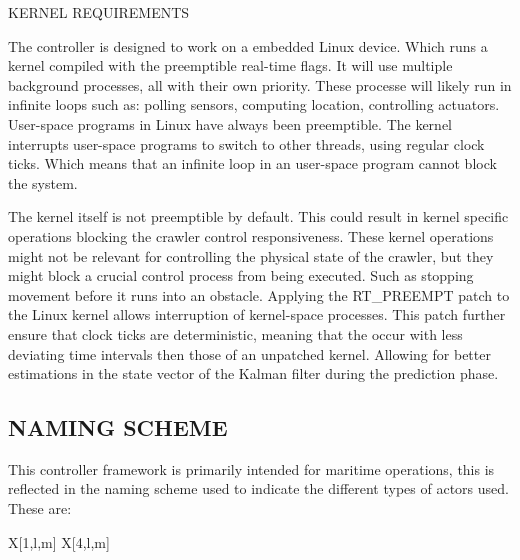 \begin{RoyalNote}[label=Kernel_req]{KERNEL REQUIREMENTS}

    The controller is designed to work on a embedded Linux device. Which runs a kernel compiled with the preemptible 
    real-time flags. It will use multiple background processes, all with their own priority. These processe will 
    likely run in infinite loops such as: polling sensors, computing location, controlling actuators. User-space 
    programs in Linux have always been preemptible. The kernel interrupts user-space programs to switch to other 
    threads, using regular clock ticks. Which means that an infinite loop in an user-space program cannot block the 
    system.

    The kernel itself is not preemptible by default. This could result in kernel specific operations blocking the 
    crawler control responsiveness. These kernel operations might not be relevant for controlling the physical state 
    of the crawler, but they might block a crucial control process from being executed. Such as stopping movement 
    before it runs into an obstacle. Applying the RT\_PREEMPT patch to the Linux kernel allows interruption of 
    kernel-space processes. This patch further ensure that clock ticks are deterministic, meaning that the occur with
    less deviating time intervals then those of an unpatched kernel. Allowing for better estimations in the state 
    vector of the Kalman filter during the prediction phase.

\end{RoyalNote}

\subsection{NAMING SCHEME}\label{sec:naming scheme}

\noindent This controller framework is primarily intended for maritime operations, this is reflected in the naming 
scheme used to
indicate the different types of actors used. These are:

\begin{RoyalTable}{X[1,l,m] X[4,l,m]}
\end{RoyalTable}

